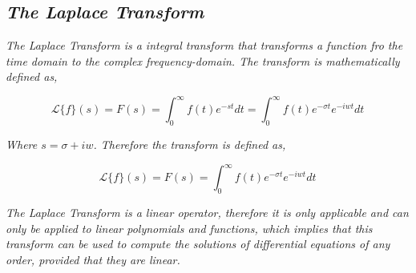 

\subsection{\textit{The Laplace Transform}}

	\textit{The Laplace Transform is a integral transform that transforms a function fro the time domain to the complex frequency-domain. The transform is mathematically defined as,}

		$$\mathcal{L}\{f\}(s) = F(s) = \int_0^{\infty}f(t)e^{-st} dt = \int_0^{\infty}f(t)e^{-\sigma t}e^{-iwt} dt$$

	\textit{Where $s = \sigma + iw$. Therefore the transform is defined as,}
	
		$$\mathcal{L}\{f\}(s) = F(s) = \int_0^{\infty}f(t)e^{-\sigma t}e^{-iwt} dt$$
	
	\textit{The Laplace Transform is a linear operator, therefore it is only applicable and can only be applied to linear polynomials and functions, which implies that this transform can be used to compute the solutions of differential equations of any order, provided that they are linear.}
	
	
	
